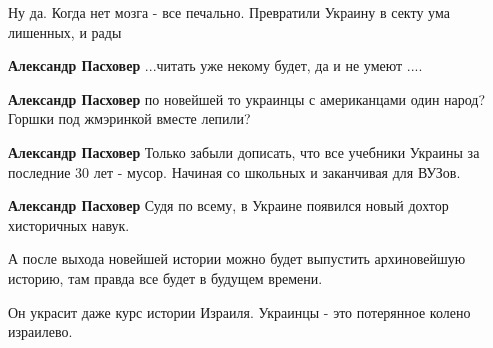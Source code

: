 \begin{itemize}
\begin{itemize}
Ну да. Когда нет мозга - все печально. Превратили Украину в секту ума лишенных, и рады

 
\textbf{Александр Пасховер} ...читать уже некому будет, да и не умеют ....

 
\textbf{Александр Пасховер} по новейшей то украинцы с американцами один народ? Горшки под жмэринкой вместе лепили?

 
\textbf{Александр Пасховер} Только забыли дописать, что все учебники Украины за последние 30 лет - мусор. Начиная со школьных и заканчивая для ВУЗов.

 
\textbf{Александр Пасховер} Судя по всему, в Украине появился новый дохтор хисторичных навук.

 
А после выхода новейшей истории можно будет выпустить архиновейшую историю, там правда все будет в будущем времени.

 
Он украсит даже курс истории Израиля. Украинцы - это потерянное колено израилево.


\end{itemize}
\end{itemize}
